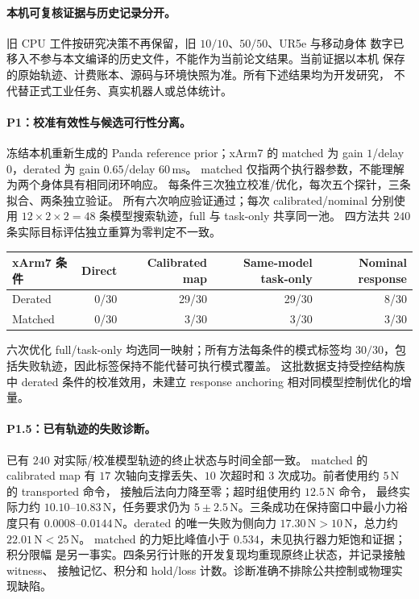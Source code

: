 \paragraph{本机可复核证据与历史记录分开。}
旧 CPU 工件按研究决策不再保留，旧 $10/10$、$50/50$、UR5e 与移动身体
数字已移入不参与本文编译的历史文件，不能作为当前论文结果。当前证据以本机
保存的原始轨迹、计费账本、源码与环境快照为准。所有下述结果均为开发研究，
不代替正式工业任务、真实机器人或总体统计。

\paragraph{P1：校准有效性与候选可行性分离。}
冻结本机重新生成的 Panda reference prior；xArm7 的 matched 为
gain $1$/delay $0$，derated 为 gain $0.65$/delay $60\,\mathrm{ms}$。
matched 仅指两个执行器参数，不能理解为两个身体具有相同闭环响应。
每条件三次独立校准/优化，每次五个探针，三条拟合、两条独立验证。
所有六次响应验证通过；每次 calibrated/nominal 分别使用
$12\times2\times2=48$ 条模型搜索轨迹，full 与 task-only 共享同一池。
四方法共 $240$ 条实际目标评估独立重算为零判定不一致。
\begin{center}
\small
\begin{tabular}{lrrrr}
\toprule
xArm7 条件 & Direct & Calibrated map & Same-model task-only & Nominal response\\
\midrule
Derated & 0/30 & 29/30 & 29/30 & 8/30\\
Matched & 0/30 & 3/30 & 3/30 & 3/30\\
\bottomrule
\end{tabular}
\end{center}
六次优化 full/task-only 均选同一映射；所有方法每条件的模式标签均
$30/30$，包括失败轨迹，因此标签保持不能代替可执行模式覆盖。
这批数据支持受控结构族中 derated 条件的校准效用，未建立 response
anchoring 相对同模型控制优化的增量。

\paragraph{P1.5：已有轨迹的失败诊断。}
已有 $240$ 对实际/校准模型轨迹的终止状态与时间全部一致。
matched 的 calibrated map 有 $17$ 次轴向支撑丢失、$10$ 次超时和
$3$ 次成功。前者使用约 $5\,\mathrm N$ 的 transported 命令，
接触后法向力降至零；超时组使用约 $12.5\,\mathrm N$ 命令，
最终实际力约 $10.10$--$10.83\,\mathrm N$，任务要求仍为
$5\pm2.5\,\mathrm N$。三条成功在保持窗口中最小力裕度只有
$0.0008$--$0.0144\,\mathrm N$。derated 的唯一失败为侧向力
$17.30\,\mathrm N>10\,\mathrm N$，总力约 $22.01\,\mathrm N<25\,\mathrm N$。
matched 的力矩比峰值小于 $0.534$，未见执行器力矩饱和证据；积分限幅
是另一事实。四条另行计账的开发复现均重现原终止状态，并记录接触 witness、
接触记忆、积分和 hold/loss 计数。诊断准确不排除公共控制或物理实现缺陷。

